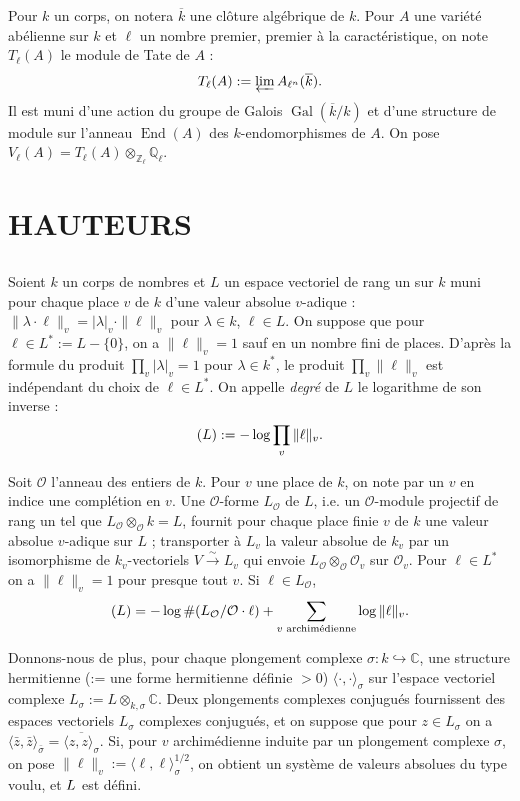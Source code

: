 \documentclass[12pt,a4paper]{article}
\theoremstyle{plain}
\theoremstyle{definition}
\theoremstyle{remark}
\DeclareMathOperator{\End}{End}
\DeclareMathOperator{\Gal}{Gal}
\newcommand{\CC}{\mathbb{C}}
\newcommand{\QQ}{\mathbb{Q}}
\newcommand{\ZZ}{\mathbb{Z}}
\newcommand{\cO}{\mathcal{O}}
\let\deg\relax
\providecommand{\CC}{\mathbb{C}}
\providecommand{\QQ}{\mathbb{Q}}
\providecommand{\ZZ}{\mathbb{Z}}
\providecommand{\cO}{\mathcal{O}}
\providecommand{\End}{\operatorname{End}}
\providecommand{\Gal}{\operatorname{Gal}}
\begin{document}
Pour $k$ un corps, on notera $\overline{k}$ une clôture algébrique de $k$. Pour $A$ une variété abélienne sur $k$ et $\ell$ un nombre premier, premier à la caractéristique, on note $T_\ell(A)$ le module de Tate de $A$ :
\[
T_\ell(A) := \varprojlim A_{\ell^n}(\overline{k}).
\]
Il est muni d'une action du groupe de Galois $\Gal(\overline{k}/k)$ et d'une structure de module sur l'anneau $\End(A)$ des $k$-endomorphismes de $A$. On pose $V_\ell(A) = T_\ell(A) \otimes_{\ZZ_\ell} \QQ_\ell$.

\section{HAUTEURS}

\subsection{}

Soient $k$ un corps de nombres et $L$ un espace vectoriel de rang un sur $k$ muni pour chaque place $v$ de $k$ d'une valeur absolue $v$-adique : $\|\lambda \cdot \ell\|_v = |\lambda|_v \cdot \|\ell\|_v$ pour $\lambda \in k$, $\ell \in L$. On suppose que pour $\ell \in L^* := L - \{0\}$, on a $\|\ell\|_v = 1$ sauf en un nombre fini de places. D'après la formule du produit $\prod_v |\lambda|_v = 1$ pour $\lambda \in k^*$, le produit $\prod_v \|\ell\|_v$ est indépendant du choix de $\ell \in L^*$. On appelle \emph{degré} de $L$ le logarithme de son inverse :
\[
\deg(L) := -\log \prod_v \|\ell\|_v.
\]

Soit $\cO$ l'anneau des entiers de $k$. Pour $v$ une place de $k$, on note par un $v$ en indice une complétion en $v$. Une $\cO$-forme $L_{\cO}$ de $L$, i.e. un $\cO$-module projectif de rang un tel que $L_{\cO} \otimes_{\cO} k = L$, fournit pour chaque place finie $v$ de $k$ une valeur absolue $v$-adique sur $L$ ; transporter à $L_v$ la valeur absolue de $k_v$ par un isomorphisme de $k_v$-vectoriels $V \xrightarrow{\sim} L_v$ qui envoie $L_{\cO} \otimes_{\cO} \cO_v$ sur $\cO_v$. Pour $\ell \in L^*$ on a $\|\ell\|_v = 1$ pour presque tout $v$. Si $\ell \in L_{\cO}$,
\[
\deg(L) = -\log \#(L_{\cO}/\cO \cdot \ell) + \sum_{v \text{ archimédienne}} \log \|\ell\|_v.
\]

Donnons-nous de plus, pour chaque plongement complexe $\sigma : k \hookrightarrow \CC$, une structure hermitienne (:= une forme hermitienne définie $> 0$) $\langle\cdot, \cdot\rangle_\sigma$ sur l'espace vectoriel complexe $L_\sigma := L \otimes_{k,\sigma} \CC$. Deux plongements complexes conjugués fournissent des espaces vectoriels $L_\sigma$ complexes conjugués, et on suppose que pour $z \in L_\sigma$ on a $\langle \bar{z}, \bar{z}\rangle_{\bar{\sigma}} = \overline{\langle z, z\rangle_\sigma}$. Si, pour $v$ archimédienne induite par un plongement complexe $\sigma$, on pose $\|\ell\|_v := \langle \ell, \ell\rangle_\sigma^{1/2}$, on obtient un système de valeurs absolues du type voulu, et $\deg L$ est défini.
\end{document}
